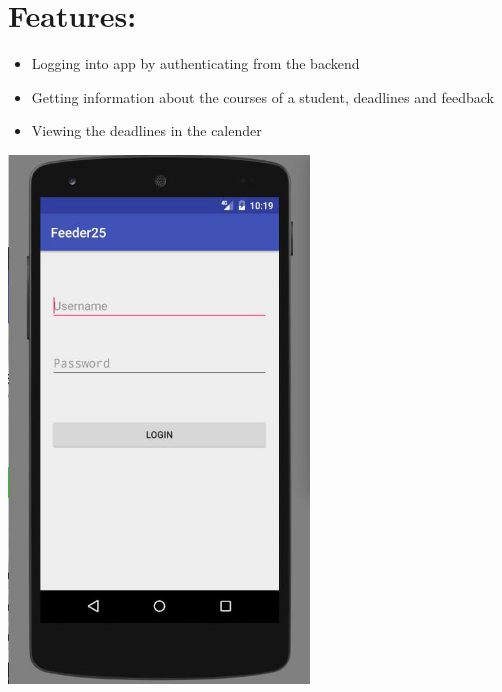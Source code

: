 \documentclass{article}
\begin{document}
\section{Features:}
\begin{itemize}
\item Logging into app by authenticating from the backend 
\item Getting information about the courses of a student, deadlines and feedback
\item Viewing the deadlines in the calender
\end{itemize}
\hfill \break
\includegraphics[width=8cm, height=14cm]{photos/android2.png}
\newpage
\end{document}
